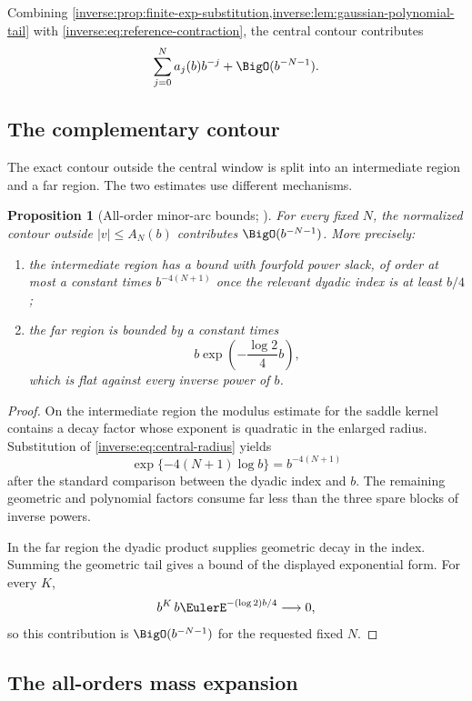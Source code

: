 \documentclass[11pt,oneside]{article}
\newtheorem{proposition}[proposition]{Proposition}
\theoremstyle{definition}
\theoremstyle{remark}
\begin{document}
Combining \cref{inverse:prop:finite-exp-substitution,inverse:lem:gaussian-polynomial-tail}
with \eqref{inverse:eq:reference-contraction}, the central contour contributes
\begin{equation}
 \sum_{j=0}^{N}a_j(b)b^{-j}+\BigO(b^{-N-1}).
 \label{inverse:eq:central-mass-expansion}
\end{equation}

\subsection{The complementary contour}

The exact contour outside the central window is split into an intermediate
region and a far region.  The two estimates use different mechanisms.

\begin{proposition}[All-order minor-arc bounds; \Formalized]
\label{inverse:prop:minor-arcs}
For every fixed $N$, the normalized contour outside
$|v|\leq A_N(b)$ contributes $\BigO(b^{-N-1})$.
More precisely:
\begin{enumerate}
\item the intermediate region has a bound with fourfold power slack,
of order at most a constant times $b^{-4(N+1)}$ once the relevant
dyadic index is at least $b/4$;
\item the far region is bounded by a constant times
\[
 b\exp\!\left(-\frac{\log2}{4}b\right),
\]
which is flat against every inverse power of $b$.
\end{enumerate}
\end{proposition}

\begin{proof}
On the intermediate region the modulus estimate for the saddle kernel
contains a decay factor whose exponent is quadratic in the enlarged
radius.  Substitution of \eqref{inverse:eq:central-radius} yields
\[
 \exp\{-4(N+1)\log b\}=b^{-4(N+1)}
\]
after the standard comparison between the dyadic index and $b$.  The
remaining geometric and polynomial factors consume far less than the
three spare blocks of inverse powers.

In the far region the dyadic product supplies geometric decay in the
index.  Summing the geometric tail gives a bound of the displayed
exponential form.  For every $K$,
\[
 b^K\,b\EulerE^{-(\log2)b/4}\longrightarrow0,
\]
so this contribution is $\BigO(b^{-N-1})$ for the requested fixed $N$.
\end{proof}

\subsection{The all-orders mass expansion}
\end{document}
